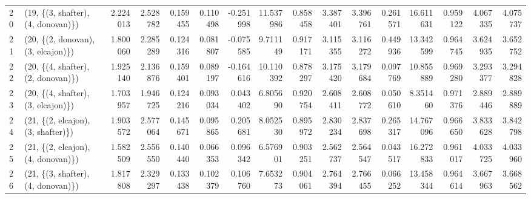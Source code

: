 \begin{tabular}{llrrrrrrrrrrrrrr}
20 &  (19, \{(3, shafter), (4, donovan)\}) &  2.224013 &  2.528782 &   0.159455 &  0.110498 & -0.251998 &  11.537986 &  0.858458 &   3.387401 &  3.396761 &  0.261571 &  16.611631 &  0.959122 &  4.067335 &  4.075737 \\
21 &  (20, \{(2, donovan), (3, elcajon)\}) &  1.800060 &  2.285289 &   0.124316 &  0.081807 & -0.075585 &   9.711149 &  0.917171 &   3.115355 &  3.116272 &  0.449936 &  13.342599 &  0.964745 &  3.624935 &  3.652752 \\
22 &  (20, \{(4, shafter), (2, donovan)\}) &  1.925140 &  2.136876 &   0.159401 &  0.089197 & -0.164616 &  10.110392 &  0.878297 &   3.175420 &  3.179684 &  0.097769 &  10.855889 &  0.969280 &  3.293377 &  3.294828 \\
23 &  (20, \{(4, shafter), (3, elcajon)\}) &  1.703957 &  1.946725 &   0.124216 &  0.093034 &  0.043402 &   6.805690 &  0.920754 &   2.608411 &  2.608772 &  0.050610 &   8.351460 &  0.971376 &  2.889446 &  2.889889 \\
24 &  (21, \{(2, elcajon), (3, shafter)\}) &  1.903572 &  2.577064 &   0.145671 &  0.095865 &  0.205681 &   8.052530 &  0.895972 &   2.830234 &  2.837698 &  0.265317 &  14.767096 &  0.966650 &  3.833628 &  3.842798 \\
25 &  (21, \{(2, elcajon), (4, donovan)\}) &  1.582509 &  2.556550 &   0.140440 &  0.066353 &  0.096342 &   6.576901 &  0.903251 &   2.562737 &  2.564547 &  0.043517 &  16.272833 &  0.961017 &  4.033725 &  4.033960 \\
26 &  (21, \{(3, shafter), (4, donovan)\}) &  1.817808 &  2.329297 &   0.133438 &  0.102379 &  0.106760 &   7.653273 &  0.904061 &   2.764394 &  2.766455 &  0.066252 &  13.458344 &  0.964614 &  3.667963 &  3.668562 \\
\bottomrule
\end{tabular}
